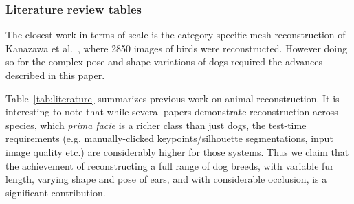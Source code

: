 \subsubsection{Literature review tables}

The closest work in terms of scale is the category-specific mesh reconstruction of Kanazawa et al.~\cite{kanazawa2018birds}, where 2850 images of birds were reconstructed.  However doing so for the complex pose and shape variations of dogs required the advances described in this paper.

Table~\ref{tab:literature} summarizes previous work on animal reconstruction.
It is interesting to note that while several papers demonstrate reconstruction across species, which {\em prima facie} is a richer class than just dogs, the test-time requirements (e.g. manually-clicked keypoints/silhouette segmentations, input image quality etc.) are considerably higher for those systems.
Thus we claim that the achievement of reconstructing a full range of dog breeds, 
with variable fur length, varying shape and pose of ears, and with considerable occlusion, is a significant contribution.
